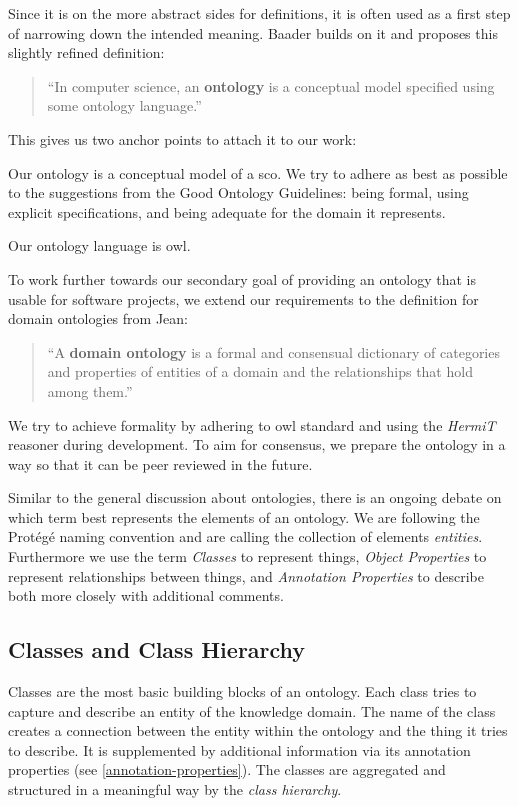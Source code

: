 \documentclass[a4paper, DIV=13, BCOR=0cm]{scrbook}
\begin{document}
Since it is on the more abstract sides for definitions, it is often used as a first step of narrowing down the intended meaning. Baader builds on it and proposes this slightly refined definition:

\begin{quote}
	\enquote{In computer science, an \textbf{ontology} is a conceptual model specified using some ontology language.} \cite[p.\,205]{baader2017introduction}
\end{quote}

This gives us two anchor points to attach it to our work:
\begin{inparaenum}
	\item Our ontology is a conceptual model of a \gls{sco}. We try to adhere as best as possible to the suggestions from the Good Ontology Guidelines: being formal, using explicit specifications, and being adequate for the domain it represents. \cite[p.\,10]{schulz2012guideline}
	\item Our ontology language is \gls{owl}.
\end{inparaenum}

To work further towards our secondary goal of providing an ontology that is usable for software projects, we extend our requirements to the definition for domain ontologies from Jean: 

\begin{quote}
	\enquote{A \textbf{domain ontology }is a formal and consensual dictionary of categories and properties of entities of a domain and the relationships that hold among them.} \cite[p.\,240]{Jean_2007}
\end{quote}

We try to achieve formality by adhering to \gls{owl} standard \cite{w3c-owl-guide} and using the \textit{HermiT} reasoner during development. To aim for consensus, we prepare the ontology in a way so that it can be peer reviewed in the future.

Similar to the general discussion about ontologies, there is an ongoing debate on which term best represents the elements of an ontology. We are following the Protégé naming convention and are calling the collection of elements \textit{entities}. Furthermore we use the term \textit{Classes} to represent things, \textit{Object Properties} to represent relationships between things, and \textit{Annotation Properties} to describe both more closely with additional comments.

\subsection{Classes and Class Hierarchy}
\label{classes}
Classes are the most basic building blocks of an ontology. Each class tries to capture and describe an entity of the knowledge domain. The name of the class creates a connection between the entity within the ontology and the thing it tries to describe. It is supplemented by additional information via its annotation properties (see \ref{annotation-properties}). The classes are aggregated and structured in a meaningful way by the \textit{class hierarchy}.
\end{document}
